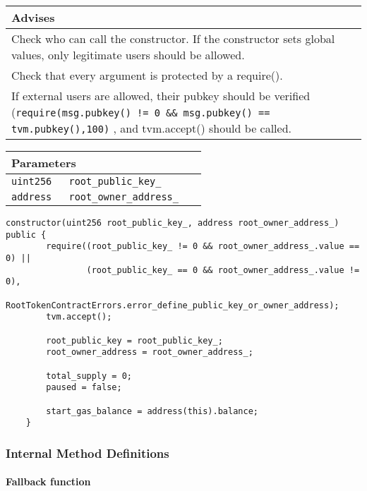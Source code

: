 \ifsoldraft
\noindent\begin{tabular}{|p{12cm}|}\hline
\rowcolor{green}Advises
\\\hline
Check who can call the constructor. If the constructor sets global values, only legitimate users should be allowed.
\\\hline
Check that every argument is protected by a require().
\\\hline
If external users are allowed, their pubkey should be verified (\verb+require(msg.pubkey() != 0 && msg.pubkey() == tvm.pubkey(),100)+ , and tvm.accept() should be called.
\\\hline\end{tabular}
\fi

\ifsoltables
\noindent\begin{tabular}{|l|l|p{5cm}|}\hline
\multicolumn{3}{|l|}{\bf Parameters}\\\hline
\tt uint256 & \tt root\_{}public\_{}key\_{} &\\\hline
\tt address & \tt root\_{}owner\_{}address\_{} &\\\hline
\end{tabular}
\fi

\vspace{2cm}

\begin{lstlisting}[firstnumber=48]
    constructor(uint256 root_public_key_, address root_owner_address_) public {
        require((root_public_key_ != 0 && root_owner_address_.value == 0) ||
                (root_public_key_ == 0 && root_owner_address_.value != 0),
                RootTokenContractErrors.error_define_public_key_or_owner_address);
        tvm.accept();

        root_public_key = root_public_key_;
        root_owner_address = root_owner_address_;

        total_supply = 0;
        paused = false;

        start_gas_balance = address(this).balance;
    }
\end{lstlisting}

\subsubsection{Internal Method Definitions}


\paragraph{Fallback function}

